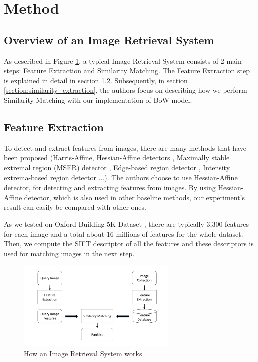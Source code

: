 % 

\section{Method} \label{section:method}
\subsection{Overview of an Image Retrieval System}

As described in Figure \ref{fig:image_retrieval_system}, a typical Image Retrieval System consists of 2 main steps: Feature Extraction and Similarity Matching. The Feature Extraction step is explained in detail in section \ref{section:feature_extraction}. Subsequently, in section \ref{section:similarity_extraction}, the authors focus on describing how we perform Similarity Matching with our implementation of BoW model.


\subsection{Feature Extraction} \label{section:feature_extraction}

To detect and extract features from images, there are many methods that have been proposed (Harris-Affine, Hessian-Affine detectors \cite{Mikolajczyk2004}, Maximally stable extremal region (MSER) detector \cite{conf/bmvc/MatasCUP02}, Edge-based region detector \cite{Tuytelaars99content-basedimage}, Intensity extrema-based region detector \cite{Tuytelaars00widebaseline} ...). The authors choose to use Hessian-Affine detector, for detecting and extracting features from images. By using Hessian-Affine detector, which is also used in other baseline methods, our experiment's result can easily be compared with other ones.

As we tested on Oxford Building 5K Dataset \cite{oxbuilding}, there are typically 3,300 features for each image and a total about 16 millions of features for the whole dataset. Then, we compute the SIFT descriptor \cite{Lowe2004} of all the features and these descriptors is used for matching images in the next step.

\begin{figure}
    \centering
    \includegraphics[width=3.0in]{ImageRetrievalSystem.pdf}
    \caption{How an Image Retrieval System works}
    \label{fig:image_retrieval_system}
\end{figure}

